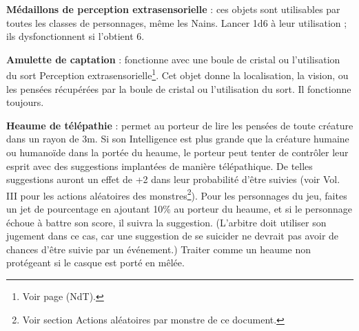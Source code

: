 {\bigskip

\label{objet-medaillon-esp}\textbf{Médaillons de perception extrasensorielle} : ces objets sont utilisables par toutes les classes de personnages, même les Nains. Lancer 1d6 à leur utilisation ; ils dysfonctionnent si l'obtient 6.

\bigskip

\label{objet-amulette-captation}\textbf{Amulette de captation} : fonctionne avec une boule de cristal ou l'utilisation du sort Perception extrasensorielle\footnote{Voir page \pageref{sort-esp} (NdT).}. Cet objet donne la localisation, la vision, ou les pensées récupérées par la boule de cristal ou l'utilisation du sort. Il fonctionne toujours.

\bigskip

\label{objet-heaume-telepathie}\textbf{Heaume de télépathie} : permet au porteur de lire les pensées de toute créature dans un rayon de 3m. Si son Intelligence est plus grande que la créature humaine ou humanoïde dans la portée du heaume, le porteur peut tenter de contrôler leur esprit avec des suggestions implantées de manière télépathique. De telles suggestions auront un effet de +2 dans leur probabilité d'être suivies (voir Vol. III pour les actions aléatoires des monstres\footnote{Voir section \og Actions aléatoires par monstre \fg{} de ce document.}). Pour les personnages du jeu, faites un jet de pourcentage en ajoutant 10\% au porteur du heaume, et si le personnage échoue à battre son score,%
il suivra la suggestion. (L'arbitre doit utiliser son jugement dans ce cas, car une suggestion de se suicider ne devrait pas avoir de chances d'être suivie par un événement.) Traiter comme un heaume non protégeant si le casque est porté en mêlée.

}%


